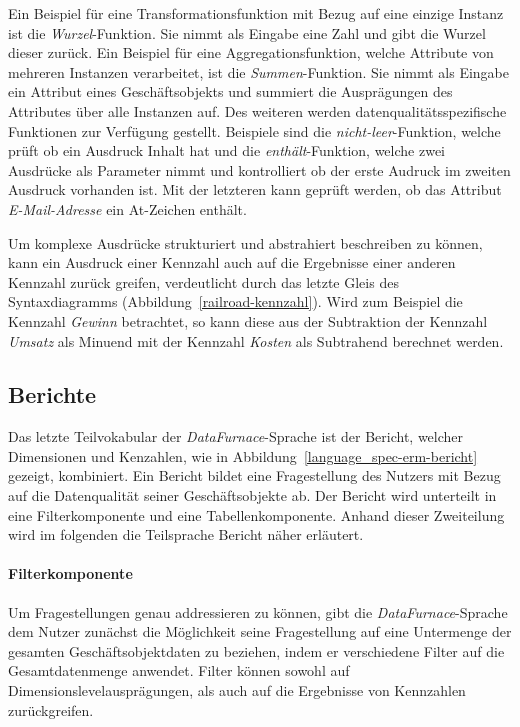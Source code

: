\documentclass[
  language=german, %
  type=bachelor%
]{isthesis}
\begin{document}
\begin{content}
  Ein  Beispiel für eine Transformationsfunktion mit Bezug auf
  eine einzige Instanz ist die \textit{Wurzel}-Funktion.  Sie nimmt als Eingabe
  eine Zahl und gibt die Wurzel dieser zurück. Ein Beispiel für eine
  Aggregationsfunktion, welche Attribute von mehreren Instanzen verarbeitet,
  ist die \textit{Summen}-Funktion. Sie nimmt als Eingabe ein Attribut eines
  Geschäftsobjekts und summiert die Ausprägungen des Attributes über alle
  Instanzen auf. Des weiteren werden datenqualitätsspezifische Funktionen zur
  Verfügung gestellt. Beispiele sind die \textit{nicht-leer}-Funktion, welche
  prüft ob ein Ausdruck Inhalt hat und die \textit{enthält}-Funktion, welche
  zwei Ausdrücke als Parameter nimmt und kontrolliert ob der erste Audruck im
  zweiten Ausdruck vorhanden ist. Mit der letzteren kann \zB{} geprüft werden,
  ob das Attribut \textit{E-Mail-Adresse} ein At-Zeichen enthält.

  Um komplexe Ausdrücke strukturiert und abstrahiert beschreiben zu können,
  kann ein Ausdruck einer Kennzahl auch auf die Ergebnisse einer anderen
  Kennzahl zurück greifen, verdeutlicht durch das letzte Gleis des
  Syntaxdiagramms (Abbildung~\ref{railroad-kennzahl}). Wird zum Beispiel die
  Kennzahl \textit{Gewinn} betrachtet, so kann diese aus der Subtraktion der
  Kennzahl \textit{Umsatz} als Minuend mit der Kennzahl \textit{Kosten} als
  Subtrahend berechnet werden.


  \subsection{Berichte}

  Das letzte Teilvokabular der \textit{DataFurnace}-Sprache ist der Bericht,
  welcher Dimensionen und Kenzahlen, wie in
  Abbildung~\ref{language_spec-erm-bericht} gezeigt, kombiniert. Ein Bericht
  bildet eine Fragestellung des Nutzers mit Bezug auf die Datenqualität seiner
  Geschäftsobjekte ab. Der Bericht wird unterteilt in eine Filterkomponente und
  eine Tabellenkomponente. Anhand dieser Zweiteilung wird im folgenden die
  Teilsprache Bericht näher erläutert.

  \begin{figure}[caption={Bericht-Teilsprache}, label={language_spec-erm-bericht}]
    \resizebox{120px}{!}{}
  \end{figure}
  
  \paragraph{Filterkomponente}\label{paragraph:filternde-komponente} Um
  Fragestellungen genau addressieren zu können, gibt die
  \textit{DataFurnace}-Sprache dem Nutzer zunächst die Möglichkeit seine
  Fragestellung auf eine Untermenge der gesamten Geschäftsobjektdaten zu
  beziehen, indem er verschiedene Filter auf die Gesamtdatenmenge anwendet.
  Filter können sowohl auf Dimensionslevelausprägungen, als auch auf die
  Ergebnisse von Kennzahlen zurückgreifen. 
  

\end{content}
\end{document}
